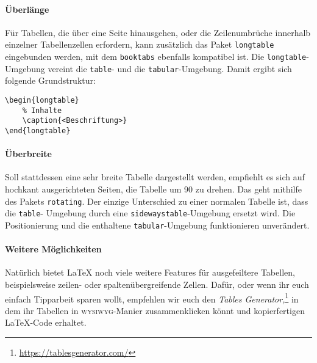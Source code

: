 \paragraph{Überlänge}
Für Tabellen, die über eine Seite hinausgehen, oder die Zeilenumbrüche innerhalb einzelner Tabellenzellen erfordern, kann zusätzlich das Paket \texttt{longtable} eingebunden werden, mit dem \texttt{booktabs} ebenfalls kompatibel ist.
Die \texttt{longtable}-Umgebung vereint die \texttt{table}- und die \texttt{tabular}-Umgebung.
Damit ergibt sich folgende Grundstruktur:

\begin{verbatim}
\begin{longtable}
    % Inhalte
    \caption{<Beschriftung>}
\end{longtable}
\end{verbatim}

\paragraph{Überbreite}
Soll stattdessen eine sehr breite Tabelle dargestellt werden, empfiehlt es sich auf hochkant ausgerichteten Seiten, die Tabelle um 90\textdegree{} zu drehen.
Das geht mithilfe des Pakets \texttt{rotating}.
Der einzige Unterschied zu einer normalen Tabelle ist, dass die \texttt{table}- Umgebung durch eine \texttt{sidewaystable}-Umgebung ersetzt wird.
Die Positionierung und die enthaltene \texttt{tabular}-Umgebung funktionieren unverändert.

\paragraph{Weitere Möglichkeiten}
Natürlich bietet \LaTeX{} noch viele weitere Features für ausgefeiltere Tabellen, beispielsweise zeilen- oder spaltenübergreifende Zellen. 
Dafür, oder wenn ihr euch einfach Tipparbeit sparen wollt, empfehlen wir euch den \emph{Tables Generator,}\footnote{\url{https://tablesgenerator.com/}} in dem ihr Tabellen in \textsc{wysiwyg}-Manier zusammenklicken könnt und kopierfertigen \LaTeX-Code erhaltet.


